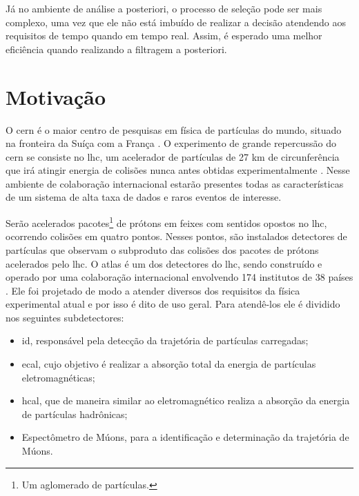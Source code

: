 Já no ambiente de análise a posteriori, o processo de seleção pode ser mais
complexo, uma vez que ele não está imbuído de realizar a decisão atendendo aos
requisitos de tempo quando em tempo real. Assim, é esperado 
uma melhor eficiência quando realizando a filtragem a posteriori.

\section{Motivação} 

O \gls{cern} é o maior centro de
pesquisas em física de partículas do mundo, situado na fronteira da Suíça com a
França \cite{webCERN}. O experimento de grande repercussão do \gls{cern} se
consiste no \gls{lhc}, um acelerador de partículas de 27 km de
circunferência que irá atingir energia de colisões nunca antes obtidas
experimentalmente \cite{webLHC}. 
Nesse ambiente de colaboração internacional estarão presentes
todas as características de um sistema de alta taxa de dados e raros eventos de
interesse.

Serão acelerados pacotes\footnote{Um aglomerado de partículas.} de prótons em
feixes com sentidos opostos no \gls{lhc},
ocorrendo colisões em quatro pontos. Nesses pontos, são instalados 
detectores de partículas que observam o subproduto das colisões dos pacotes de prótons 
acelerados pelo \gls{lhc}. O \gls{atlas} é um dos detectores do
\gls{lhc}, sendo construído e operado por 
uma colaboração internacional envolvendo 174 institutos de 38
países \cite{webATLAS}. Ele foi projetado 
de modo a atender diversos dos requisitos da física experimental atual e por isso é dito de uso
geral. Para atendê-los ele é dividido nos seguintes subdetectores:


\begin{itemize}
\item \gls{id}, responsável pela detecção da trajetória de partículas carregadas;
\item \gls{ecal}, cujo objetivo é realizar a absorção total da
energia de partículas eletromagnéticas;
\item \gls{hcal}, que de maneira similar ao eletromagnético realiza a
absorção da energia de partículas hadrônicas;
\item Espectômetro de Múons, para a identificação e determinação da trajetória de
Múons.
\end{itemize}

